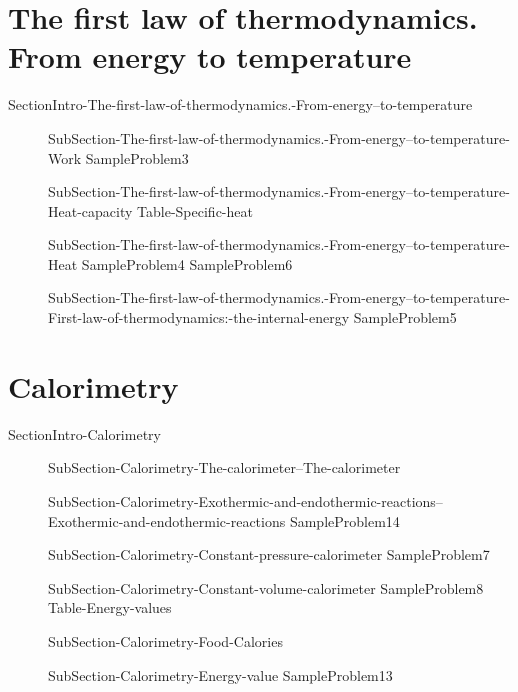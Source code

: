 \documentclass[main.tex]{subfiles}
\begin{document}
\section{The first law of thermodynamics. From energy  to temperature}
{SectionIntro-The-first-law-of-thermodynamics.-From-energy--to-temperature}
\sloppy\begin{description}
\item[] 
  {SubSection-The-first-law-of-thermodynamics.-From-energy--to-temperature-Work}
   {SampleProblem3}
\item[] 
  {SubSection-The-first-law-of-thermodynamics.-From-energy--to-temperature-Heat-capacity}
   {Table-Specific-heat}
\item[] 
  {SubSection-The-first-law-of-thermodynamics.-From-energy--to-temperature-Heat}
   {SampleProblem4}
      {SampleProblem6}
\item[] 
  {SubSection-The-first-law-of-thermodynamics.-From-energy--to-temperature-First-law-of-thermodynamics:-the-internal-energy}
   {SampleProblem5}

\end{description}

\section{Calorimetry}
{SectionIntro-Calorimetry}
\sloppy\begin{description}
\item[] 
  {SubSection-Calorimetry-The-calorimeter--The-calorimeter}
\item[]  {SubSection-Calorimetry-Exothermic-and-endothermic-reactions--Exothermic-and-endothermic-reactions}
  {SampleProblem14}
\item[] {SubSection-Calorimetry-Constant-pressure-calorimeter}
   {SampleProblem7}
\item[]  {SubSection-Calorimetry-Constant-volume-calorimeter}
   {SampleProblem8}
\hspace{-2cm}{Figure-Calorimeter}
 {Table-Energy-values}

\item[]  {SubSection-Calorimetry-Food-Calories}
\item[]  {SubSection-Calorimetry-Energy-value}
 {SampleProblem13}

\end{description}
     
\end{document}
